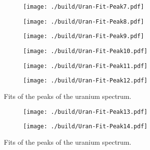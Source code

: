 \begin{figure}[H]
	\begin{adjustbox}{width=1.3\textwidth, center}
		\begin{subfigure}{.5\textwidth}
			\centering
			\texttt{[image: ./build/Uran-Fit-Peak7.pdf]}
		\end{subfigure}%
		\begin{subfigure}{.5\textwidth}
			\centering
			\texttt{[image: ./build/Uran-Fit-Peak8.pdf]}
		\end{subfigure}
	\end{adjustbox}
	\begin{adjustbox}{width=1.3\textwidth, center}
		\begin{subfigure}{.5\textwidth}
			\centering
			\texttt{[image: ./build/Uran-Fit-Peak9.pdf]}
		\end{subfigure}%
		\begin{subfigure}{.5\textwidth}
			\centering
			\texttt{[image: ./build/Uran-Fit-Peak10.pdf]}
		\end{subfigure}
	\end{adjustbox}
	\begin{adjustbox}{width=1.3\textwidth, center}
		\begin{subfigure}{.5\textwidth}
			\centering
			\texttt{[image: ./build/Uran-Fit-Peak11.pdf]}
		\end{subfigure}%
		\begin{subfigure}{.5\textwidth}
			\centering
			\texttt{[image: ./build/Uran-Fit-Peak12.pdf]}
		\end{subfigure}
	\end{adjustbox}
	\caption{Fits of the peaks of the uranium spectrum.}
\end{figure}
\begin{figure}[H]
	\begin{adjustbox}{width=1.3\textwidth, center}
		\begin{subfigure}{.5\textwidth}
			\centering
			\texttt{[image: ./build/Uran-Fit-Peak13.pdf]}
		\end{subfigure}%
		\begin{subfigure}{.5\textwidth}
			\centering
			\texttt{[image: ./build/Uran-Fit-Peak14.pdf]}
		\end{subfigure}
	\end{adjustbox}
	\caption{Fits of the peaks of the uranium spectrum.}
\end{figure}
